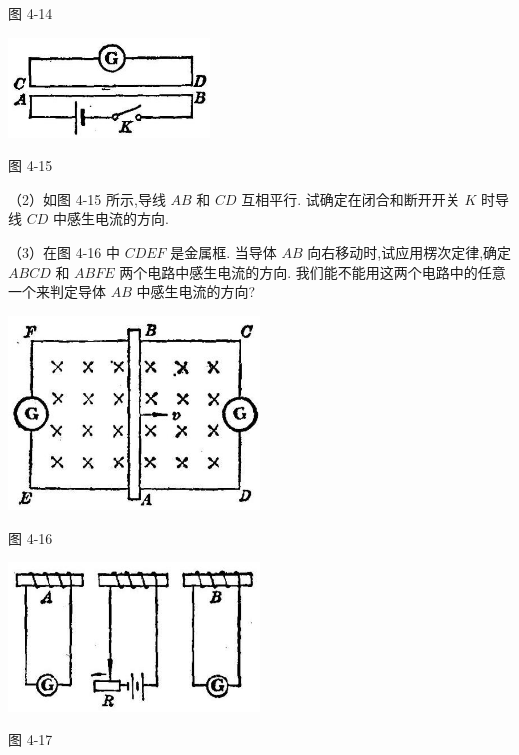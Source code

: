 \documentclass[10pt]{article}
\begin{document}
图 4-14

\begin{center}
\includegraphics[max width=0.4\textwidth]{images/01913056-1f15-74d8-9184-9aab52c9d66b_141_106978.jpg}
\end{center}

图 4-15

（2）如图 4-15 所示,导线 \({AB}\) 和 \({CD}\) 互相平行. 试确定在闭合和断开开关 \(K\) 时导线 \({CD}\) 中感生电流的方向.

（3）在图 4-16 中 \({CDEF}\) 是金属框. 当导体 \({AB}\) 向右移动时,试应用楞次定律,确定 \({ABCD}\) 和 \({ABFE}\) 两个电路中感生电流的方向. 我们能不能用这两个电路中的任意一个来判定导体 \({AB}\) 中感生电流的方向?

\begin{center}
\includegraphics[max width=0.5\textwidth]{images/01913056-1f15-74d8-9184-9aab52c9d66b_141_745225.jpg}
\end{center}

图 4-16

\begin{center}
\includegraphics[max width=0.5\textwidth]{images/01913056-1f15-74d8-9184-9aab52c9d66b_141_388360.jpg}
\end{center}

图 4-17
\end{document}
